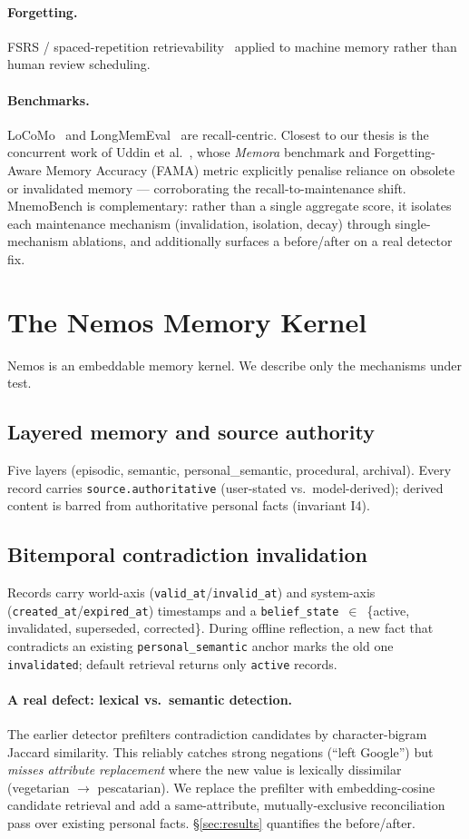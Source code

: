 \documentclass[11pt]{article}
\begin{document}
\paragraph{Forgetting.} FSRS / spaced-repetition retrievability~\cite{ssp,fsrs} applied to
machine memory rather than human review scheduling.
\paragraph{Benchmarks.} LoCoMo~\cite{locomo} and LongMemEval~\cite{longmemeval} are
recall-centric. Closest to our thesis is the concurrent work of Uddin et al.~\cite{fama},
whose \emph{Memora} benchmark and Forgetting-Aware Memory Accuracy (FAMA) metric explicitly
penalise reliance on obsolete or invalidated memory --- corroborating the
recall-to-maintenance shift. MnemoBench is complementary: rather than a single aggregate
score, it isolates each maintenance mechanism (invalidation, isolation, decay) through
single-mechanism ablations, and additionally surfaces a before/after on a real detector fix.

\section{The Nemos Memory Kernel}
\label{sec:system}
Nemos is an embeddable memory kernel. We describe only the mechanisms under test.
\subsection{Layered memory and source authority}
Five layers (episodic, semantic, personal\_semantic, procedural, archival). Every record
carries \texttt{source.authoritative} (user-stated vs.\ model-derived); derived content is
barred from authoritative personal facts (invariant I4).
\subsection{Bitemporal contradiction invalidation}
Records carry world-axis (\texttt{valid\_\allowbreak at}/\texttt{invalid\_\allowbreak at}) and system-axis
(\texttt{created\_\allowbreak at}/\texttt{expired\_\allowbreak at}) timestamps and a
\texttt{belief\_\allowbreak state}~$\in$~\{active, invalidated, superseded, corrected\}. During offline
reflection, a new fact that contradicts an existing \texttt{personal\_\allowbreak semantic} anchor marks
the old one \texttt{invalidated}; default retrieval returns only \texttt{active} records.
\paragraph{A real defect: lexical vs.\ semantic detection.}
The earlier detector prefilters contradiction candidates by character-bigram Jaccard
similarity. This reliably catches strong negations (``left Google'') but \emph{misses
attribute replacement} where the new value is lexically dissimilar (vegetarian
$\rightarrow$ pescatarian). We replace the prefilter with embedding-cosine candidate
retrieval and add a same-attribute, mutually-exclusive reconciliation pass over existing
personal facts. \S\ref{sec:results} quantifies the before/after.
\end{document}
